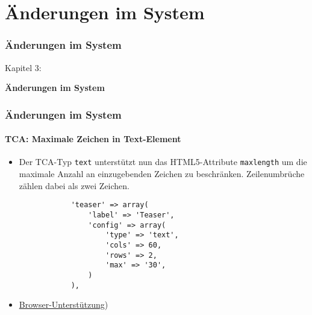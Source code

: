 %

\section{Änderungen im System}
\begin{frame}[fragile]
	\frametitle{Änderungen im System}

	\begin{center}\huge{Kapitel 3:}\end{center}
	\begin{center}\huge{\color{typo3darkgrey}\textbf{Änderungen im System}}\end{center}

\end{frame}


\begin{frame}[fragile]
	\frametitle{Änderungen im System}
	\framesubtitle{TCA: Maximale Zeichen in Text-Element}

	\begin{itemize}
		\item Der TCA-Typ \texttt{text} unterstützt nun das HTML5-Attribute \texttt{maxlength} um die maximale Anzahl an einzugebenden Zeichen zu beschränken. Zeilenumbrüche zählen dabei als zwei Zeichen.

		\begin{lstlisting}
			'teaser' => array(
				'label' => 'Teaser',
				'config' => array(
					'type' => 'text',
					'cols' => 60,
					'rows' => 2,
					'max' => '30',
				)
			),
		\end{lstlisting}

		\item \href{http://www.w3schools.com/tags/att_textarea_maxlength.asp}{Browser-Unterstützung})
	\end{itemize}

\end{frame}

